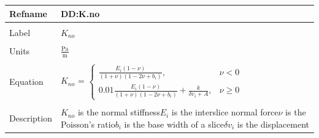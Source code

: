 \documentclass[12pt]{article}
\begin{document}
\noindent \begin{minipage}{\textwidth}
\begin{tabular}{p{} p{}}
\toprule \textbf{Refname} & \textbf{DD:K.no}
\label{DD:K.no}
\\ \midrule \\
Label & $K_{no}$
\\ \midrule \\
Units & $\frac{\text{Pa}}{\text{m}}$
\\ \midrule \\
Equation & $K_{no}$ = $\begin{cases}
\frac{E_{i}\left(1-\nu{}\right)}{\left(1+\nu{}\right)\left(1-2\nu{}+b_{i}\right)}, & \nu{}<0\\
0.01\frac{E_{i}\left(1-\nu{}\right)}{\left(1+\nu{}\right)\left(1-2\nu{}+b_{i}\right)}+\frac{k}{\delta{}v_{i}+A}, & \nu{}\geq{}0
\end{cases}$
\\ \midrule \\
Description & $K_{no}$ is the normal stiffness\newline$E_{i}$ is the interslice normal force\newline$\nu{}$ is the Poisson's ratio\newline$b_{i}$ is the base width of a slice\newline$\delta{}v_{i}$ is the displacement
\\ \bottomrule \end{tabular}
\end{minipage}\\
\end{document}
